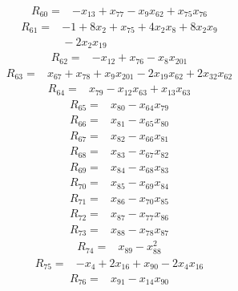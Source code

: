 \documentclass[11pt]{article}
\theoremstyle{definition}
\theoremstyle{remark}
\begin{document}
\begin{align*}
R_{60} ={}& -x_{13} + x_{77} - x_{9} x_{62} + x_{75} x_{76}
\end{align*}
\begin{align*}
R_{61} ={}& -1 + 8x_{2} + x_{75} + 4x_{2} x_{8} + 8x_{2} x_{9} \\
&{} -2x_{2} x_{19}
\end{align*}
\begin{align*}
R_{62} ={}& -x_{12} + x_{76} - x_{8} x_{201}
\end{align*}
\begin{align*}
R_{63} ={}& x_{67} + x_{78} + x_{9} x_{201} - 2x_{19} x_{62} + 2x_{32} x_{62}
\end{align*}
\begin{align*}
R_{64} ={}& x_{79} - x_{12} x_{63} + x_{13} x_{63}
\end{align*}
\begin{align*}
R_{65} ={}& x_{80} - x_{64} x_{79}
\end{align*}
\begin{align*}
R_{66} ={}& x_{81} - x_{65} x_{80}
\end{align*}
\begin{align*}
R_{67} ={}& x_{82} - x_{66} x_{81}
\end{align*}
\begin{align*}
R_{68} ={}& x_{83} - x_{67} x_{82}
\end{align*}
\begin{align*}
R_{69} ={}& x_{84} - x_{68} x_{83}
\end{align*}
\begin{align*}
R_{70} ={}& x_{85} - x_{69} x_{84}
\end{align*}
\begin{align*}
R_{71} ={}& x_{86} - x_{70} x_{85}
\end{align*}
\begin{align*}
R_{72} ={}& x_{87} - x_{77} x_{86}
\end{align*}
\begin{align*}
R_{73} ={}& x_{88} - x_{78} x_{87}
\end{align*}
\begin{align*}
R_{74} ={}& x_{89} - x_{88}^{2}
\end{align*}
\begin{align*}
R_{75} ={}& -x_{4} + 2x_{16} + x_{90} - 2x_{4} x_{16}
\end{align*}
\begin{align*}
R_{76} ={}& x_{91} - x_{14} x_{90}
\end{align*}
\end{document}
